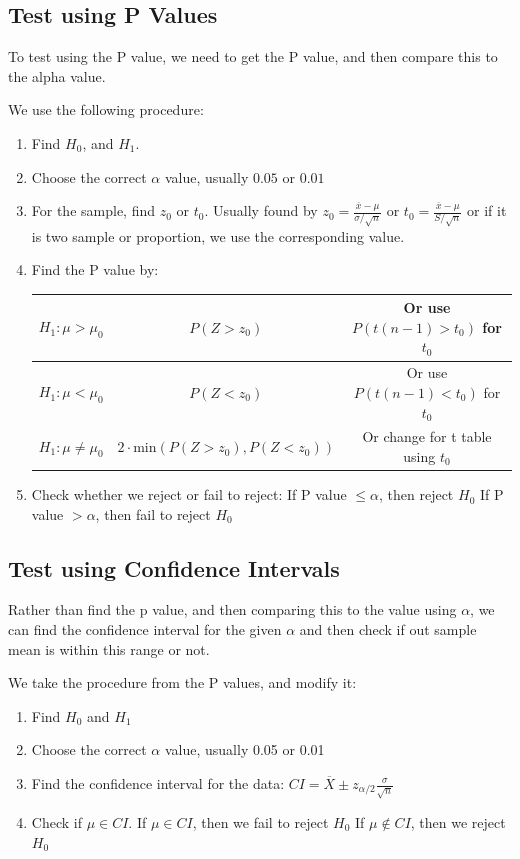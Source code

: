 \documentclass[12pt,letterpaper]{article} \usepackage{amsmath} \usepackage{graphicx} \usepackage[margin=1in]{geometry} \usepackage{longtable}  \usepackage{amssymb}
\begin{document}
	\subsection{Test using P Values}
	To test using the P value, we need to get the P value, and then compare this to the alpha value. 
	
	We use the following procedure:
	\begin{enumerate}
		\item Find $H_0$, and $H_1$.
		\item Choose the correct $\alpha$ value, usually $0.05$ or $0.01$
		\item For the sample, find $z_0$ or $t_0$. Usually found by $z_0 = \frac{\overline x - \mu}{\sigma/\sqrt n}$ or $t_0 = \frac{\overline x - \mu}{S/\sqrt n}$ or if it is two sample or proportion, we use the corresponding value. 
		\item Find the P value by:
		\subitem \begin{tabular}{|c|c|c|}
			\hline
			$H_1: \mu > \mu_0$&  $P(Z>z_0)$&Or use $P(t(n-1)>t_0)$ for $t_0$\\
			\hline
			$H_1: \mu<\mu_0$&  $P(Z<z_0)$&Or use $P(t(n-1)<t_0)$ for $t_0$\\
			\hline
			$H_1: \mu\ne\mu_0$& $2\cdot \text{min}(P(Z>z_0), P(Z<z_0))$ & Or change for t table using $t_0$\\
			\hline
		\end{tabular}
		\item Check whether we reject or fail to reject:
		\subitem If P value $\le \alpha$, then reject $H_0$
		\subitem If P value $>\alpha$, then fail to reject $H_0$
	\end{enumerate}
	
	\subsection{Test using Confidence Intervals}
	Rather than find the p value, and then comparing this to the value using $\alpha$, we can find the confidence interval for the given $\alpha$ and then check if out sample mean is within this range or not. 
	
	We take the procedure from the P values, and modify it:
	\begin{enumerate}
		\item Find $H_0$ and $H_1$
		\item Choose the correct $\alpha$ value, usually 0.05 or 0.01
		\item Find the confidence interval for the data: $CI = \overline X \pm z_{\alpha/2} \frac{\sigma}{\sqrt n}$
		\item Check if $\mu \in CI$.
		\subitem If $\mu \in CI$, then we fail to reject $H_0$
		\subitem If $\mu \notin CI$, then we reject $H_0$
	\end{enumerate}
\end{document}

